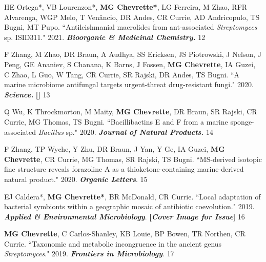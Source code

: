 \begin{cvpubs}
\cvpub
{HE Ortega*, VB Lourenzon*, \textbf{MG Chevrette*}, LG Ferreira, M Zhao, RFR Alvarenga, WGP Melo, T Venâncio, DR Andes, CR Currie, AD Andricopulo, TS Bugni, MT Pupo. ``Antileishmanial macrolides from ant-associated \textit{Streptomyces} sp. ISID311." 2021. \textit{\textbf{Bioorganic \& Medicinal Chemistry.}} \textbf{\textit{}}}
{12}

\cvpub
{F Zhang, M Zhao, DR Braun, A Audhya, SS Ericksen, JS Piotrowski, J Nelson, J Peng, GE Ananiev, S Chanana, K Barns, J Fossen, \textbf{MG Chevrette}, IA Guzei, C Zhao, L Guo, W Tang, CR Currie, SR Rajski, DR Andes, TS Bugni. ``A marine microbiome antifungal targets urgent-threat drug-resistant fungi." 2020. \textit{\textbf{Science.}} \textbf{\textit{}} \linebreak
\textbf{[\textit{}]}}
{13}

\cvpub
{Q Wu, K Throckmorton, M Maity, \textbf{MG Chevrette}, DR Braun, SR Rajski, CR Currie, MG Thomas, TS Bugni. ``Bacillibactins E and F from a marine sponge-associated \textit{Bacillus} sp." 2020. \textbf{\textit{Journal of Natural Products.}} \textbf{\textit{}}}
{14}

\cvpub
{F Zhang, TP Wyche, Y Zhu, DR Braun, J Yan, Y Ge, IA Guzei, \textbf{MG Chevrette}, CR Currie, MG Thomas, SR Rajski, TS Bugni. ``MS-derived isotopic fine structure reveals forazoline A as a thioketone-containing marine-derived natural product." 2020. \textit{\textbf{Organic Letters}}. \textbf{\textit{}}}
{15}

\cvpub
{EJ Caldera*, \textbf{MG Chevrette*}, BR McDonald, CR Currie. ``Local adaptation of bacterial symbionts within a geographic mosaic of antibiotic coevolution." 2019. \textit{\textbf{Applied \& Environmental Microbiology}}. \textbf{\textit{}} \textbf{[\textit{Cover Image for Issue}}]}
{16}

\cvpub
{\textbf{MG Chevrette}, C Carlos-Shanley, KB Louie, BP Bowen, TR Northen, CR Currie. ``Taxonomic and metabolic incongruence in the ancient genus \textit{Streptomyces}." 2019. \textit{\textbf{Frontiers in Microbiology}}. \textbf{\textit{}}}
{17}


\end{cvpubs}
